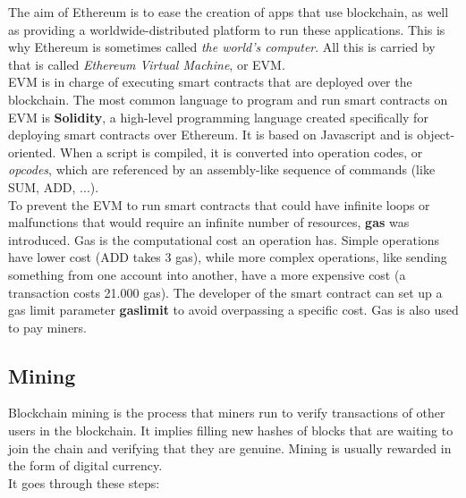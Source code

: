 \documentclass[10pt]{article}
\begin{document}
\begin{multicols}{2}
The aim of Ethereum is to ease the creation of apps that use blockchain, as well as providing a worldwide-distributed platform to run these applications. This is why Ethereum is sometimes called \textit{the world's computer}. All this is carried by that is called \textit{Ethereum Virtual Machine}, or EVM.\\

EVM is in charge of executing smart contracts that are deployed over the blockchain. The most common language to program and run smart contracts on EVM is \textbf{Solidity}, a high-level programming language created specifically for deploying smart contracts over Ethereum. It is based on Javascript and is object-oriented. When a script is compiled, it is converted into operation codes, or \textit{opcodes}, which are referenced by an assembly-like sequence of commands (like SUM, ADD, ...).\\

To prevent the EVM to run smart contracts that could have infinite loops or malfunctions that would require an infinite number of resources, \textbf{gas} was introduced. Gas is the computational cost an operation has. Simple operations have lower cost (ADD takes 3 gas), while more complex operations, like sending something from one account into another, have a more expensive cost (a transaction costs 21.000 gas). The developer of the smart contract can set up a gas limit parameter \textbf{gaslimit} to avoid overpassing a specific cost. Gas is also used to pay miners.\\

\subsection{Mining}

Blockchain mining is the process that miners run to verify transactions of other users in the blockchain. It implies filling new hashes of blocks that are waiting to join the chain and verifying that they are genuine. Mining is usually rewarded in the form of digital currency.\\

It goes through these steps:


\end{multicols}
\end{document}
